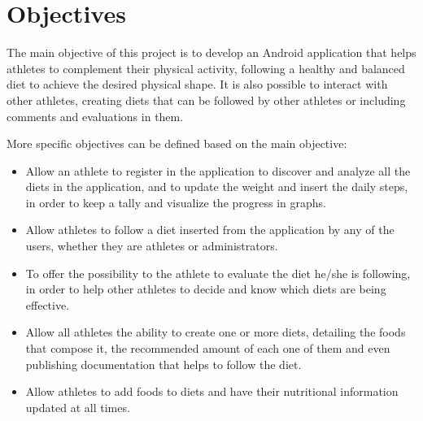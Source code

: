 \section{Objectives}
The main objective of this project is to develop an Android application that helps athletes to complement their physical activity, following a healthy and balanced diet to achieve the desired physical shape. It is also possible to interact with other athletes, creating diets that can be followed by other athletes or including comments and evaluations in them.

More specific objectives can be defined based on the main objective:
\begin{itemize}
    \item Allow an athlete to register in the application to discover and analyze all the diets in the application, and to update the weight and insert the daily steps, in order to keep a tally and visualize the progress in graphs.
    \item Allow athletes to follow a diet inserted from the application by any of the users, whether they are athletes or administrators.
    \item To offer the possibility to the athlete to evaluate the diet he/she is following, in order to help other athletes to decide and know which diets are being effective.
    \item Allow all athletes the ability to create one or more diets, detailing the foods that compose it, the recommended amount of each one of them and even publishing documentation that helps to follow the diet.
    \item Allow athletes to add foods to diets and have their nutritional information updated at all times.
\end{itemize}